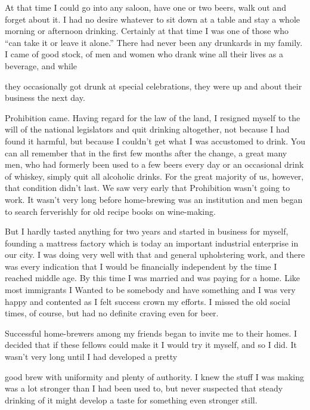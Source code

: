At that time I could go into any saloon, have one or two beers, walk out and forget about it. I had no desire whatever to sit down at a table and stay a whole morning or afternoon drinking. Certainly at that time I was one of those who “can take it or leave it alone.” There had never been any drunkards in my family. I came of good stock, of men and women who drank wine all their lives as a beverage, and while

they occasionally got drunk at special celebrations, they were up and about their business the next day.

Prohibition came. Having regard for the law of the land, I resigned myself to the will of the national legislators and quit drinking altogether, not because I had found it harmful, but because I couldn’t get what I was accustomed to drink. You can all remember that in the first few months after the change, a great many men, who had formerly been used to a few beers every day or an occasional drink of whiskey, simply quit all alcoholic drinks. For the great majority of us, however, that condition didn’t last. We saw very early that Prohibition wasn’t going to work. It wasn’t very long before home-brewing was an institution and men began to search ferverishly for old recipe books on wine-making.

But I hardly tasted anything for two years and started in business for myself, founding a mattress factory which is today an important industrial enterprise in our city. I was doing very well with that and general upholstering work, and there was every indication that I would be financially independent by the time I reached middle age. By this time I was married and was paying for a home. Like most immigrants I Wanted to be somebody and have something and I was very happy and contented as I felt success crown my efforts. I missed the old social times, of course, but had no definite craving even for beer.

Successful home-brewers among my friends began to invite me to their homes. I decided that if these fellows could make it I would try it myself, and so I did. It wasn’t very long until I had developed a pretty

good brew with uniformity and plenty of authority. I knew the stuff I was making was a lot stronger than I had been used to, but never suspected that steady drinking of it might develop a taste for something even stronger still.

